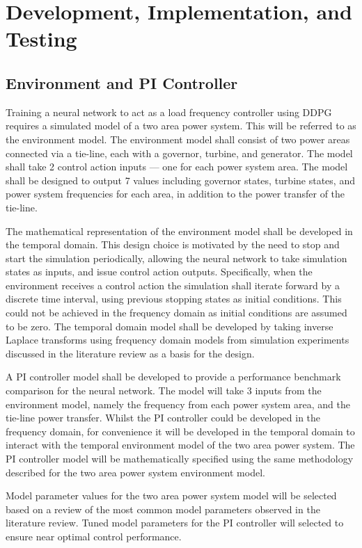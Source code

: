 \section{Development, Implementation, and Testing}
\subsection{Environment and PI Controller}
Training a neural network to act as a load frequency controller using DDPG requires a simulated model of a two area power system. This will be referred to as the environment model. The environment model shall consist of two power areas connected via a tie-line, each with a governor, turbine, and generator. The model shall take 2 control action inputs --- one for each power system area. The model shall be designed to output 7 values including governor states, turbine states, and power system frequencies for each area, in addition to the power transfer of the tie-line.

The mathematical representation of the environment model shall be developed in the temporal domain. This design choice is motivated by the need to stop and start the simulation periodically, allowing the neural network to take simulation states as inputs, and issue control action outputs. Specifically, when the environment receives a control action the simulation shall iterate forward by a discrete time interval, using previous stopping states as initial conditions. This could not be achieved in the frequency domain as initial conditions are assumed to be zero. The temporal domain model shall be developed by taking inverse Laplace transforms using frequency domain models from simulation experiments discussed in the literature review as a basis for the design.

A PI controller model shall be developed to provide a performance benchmark comparison for the neural network. The model will take 3 inputs from the environment model, namely the frequency from each power system area, and the tie-line power transfer. Whilst the PI controller could be developed in the frequency domain, for convenience it will be developed in the temporal domain to interact with the temporal environment model of the two area power system. The PI controller model will be mathematically specified using the same methodology described for the two area power system environment model.

Model parameter values for the two area power system model will be selected based on a review of the most common model parameters observed in the literature review. Tuned model parameters for the PI controller will selected to ensure near optimal control performance.

